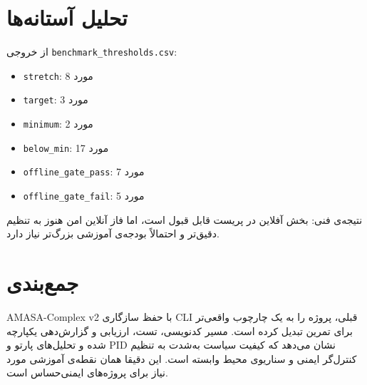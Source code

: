 \documentclass[conference]{IEEEtran}
\begin{document}
\section{تحلیل آستانه‌ها}
از خروجی \texttt{benchmark\_thresholds.csv}:
\begin{itemize}
  \item \texttt{stretch}: 8 مورد
  \item \texttt{target}: 3 مورد
  \item \texttt{minimum}: 2 مورد
  \item \texttt{below\_min}: 17 مورد
  \item \texttt{offline\_gate\_pass}: 7 مورد
  \item \texttt{offline\_gate\_fail}: 5 مورد
\end{itemize}

نتیجه‌ی فنی: بخش آفلاین در پریست  قابل قبول است، اما فاز آنلاین امن هنوز به تنظیم دقیق‌تر و احتمالاً بودجه‌ی آموزشی بزرگ‌تر نیاز دارد.

\section{جمع‌بندی}
AMASA-Complex v2 با حفظ سازگاری CLI قبلی، پروژه را به یک چارچوب واقعی‌تر برای تمرین  تبدیل کرده است. مسیر کدنویسی، تست، ارزیابی و گزارش‌دهی یکپارچه شده و تحلیل‌های پارتو و PID نشان می‌دهد که کیفیت سیاست به‌شدت به تنظیم کنترل‌گر ایمنی و سناریوی محیط وابسته است. این دقیقا همان نقطه‌ی آموزشی مورد نیاز برای پروژه‌های ایمنی‌حساس است.
\end{document}
